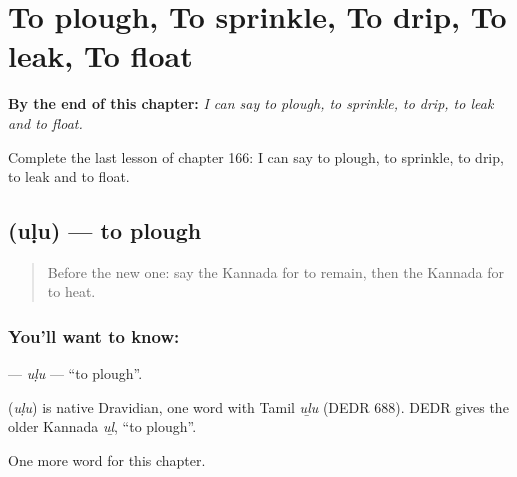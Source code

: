 
\chapter{To plough, To sprinkle, To drip, To leak, To float}
\label{ch:ka-to-plough-to-sprinkle-to-drip-to-leak-to-float}

\begin{chapteropening}
\textbf{By the end of this chapter:} \emph{I can say to plough, to sprinkle, to drip, to leak and to float.}

Complete the last lesson of chapter 166: I can say to plough, to sprinkle, to drip, to leak and to float.
\end{chapteropening}

\section[\texorpdfstring{\kn{ಉಳು} (uḷu)}{ಉಳು (uḷu)}]{ (uḷu) — to plough}

\label{lesson:KA-C166-ulu}



\begin{quote}
Before the new one: say the Kannada for to remain, then the Kannada for to heat.
\end{quote}

\subsection*{You'll want to know: }
\textbf{} — \emph{uḷu} — \textquotedblleft{}to plough\textquotedblright{}.

\begin{cousinweb}
\textbf{} (\emph{uḷu}) is native Dravidian, one word with Tamil \emph{uḻu} (DEDR 688). DEDR gives the older Kannada \emph{uḻ}, \textquotedblleft{}to plough\textquotedblright{}.
\end{cousinweb}

\begin{grammarlens}[title={What you've built}]
One more word for this chapter.
\end{grammarlens}

